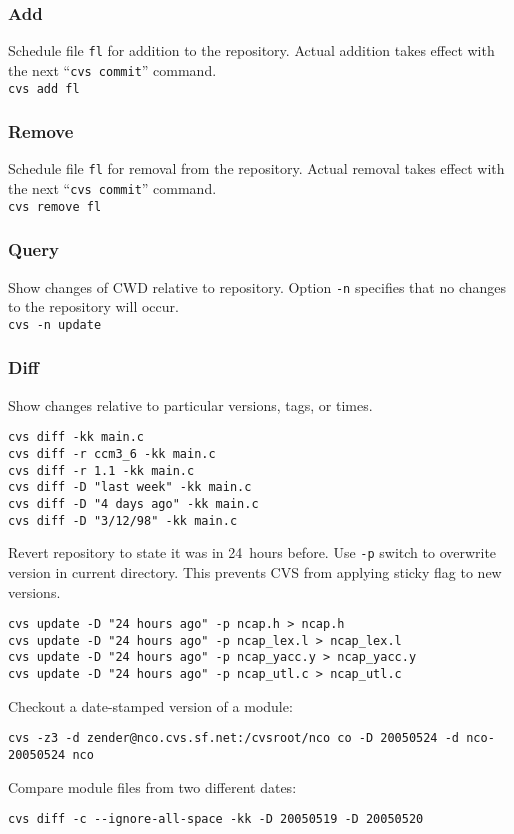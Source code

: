 \documentclass[12pt,twoside]{article}
\begin{document}
\subsubsection[Add]{Add}
Schedule file \verb'fl' for addition to the repository.  
Actual addition takes effect with the next ``\texttt{cvs commit}''
command.\\  
\verb'cvs add fl'

\subsubsection[Remove]{Remove}
Schedule file \verb'fl' for removal from the repository.  
Actual removal takes effect with the next ``\texttt{cvs commit}''
command.\\ 
\verb'cvs remove fl'

\subsubsection[Query]{Query}
Show changes of CWD relative to repository. 
Option \verb'-n' specifies that no changes to the repository will
occur.\\  
\verb'cvs -n update'

\subsubsection[Diff]{Diff}
Show changes relative to particular versions, tags, or times.
\begin{verbatim}
cvs diff -kk main.c
cvs diff -r ccm3_6 -kk main.c
cvs diff -r 1.1 -kk main.c
cvs diff -D "last week" -kk main.c
cvs diff -D "4 days ago" -kk main.c
cvs diff -D "3/12/98" -kk main.c
\end{verbatim}
Revert repository to state it was in 24~hours before.
Use \verb'-p' switch to overwrite version in current directory.
This prevents CVS from applying sticky flag to new versions.
\begin{verbatim}
cvs update -D "24 hours ago" -p ncap.h > ncap.h
cvs update -D "24 hours ago" -p ncap_lex.l > ncap_lex.l
cvs update -D "24 hours ago" -p ncap_yacc.y > ncap_yacc.y
cvs update -D "24 hours ago" -p ncap_utl.c > ncap_utl.c
\end{verbatim}
Checkout a date-stamped version of a module:
\begin{verbatim}
cvs -z3 -d zender@nco.cvs.sf.net:/cvsroot/nco co -D 20050524 -d nco-20050524 nco
\end{verbatim}
Compare module files from two different dates:
\begin{verbatim}
cvs diff -c --ignore-all-space -kk -D 20050519 -D 20050520 
\end{verbatim}
\end{document}
